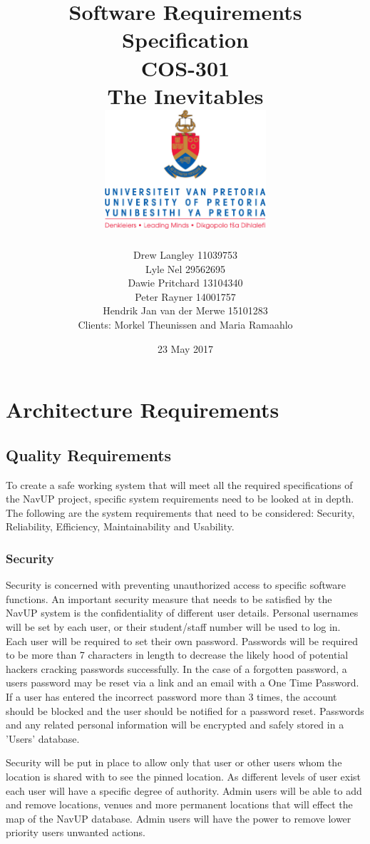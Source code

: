\documentclass{article}
\title{ Software Requirements Specification \\ COS-301 \\ The Inevitables \\[0.5cm] \includegraphics[width=6cm]{front-page}}
\author{Drew Langley \hfill 11039753 \\ Lyle Nel \hfill 29562695 \\ Dawie Pritchard \hfill 13104340 \\  Peter Rayner \hfill 14001757\\ Hendrik Jan van der Merwe \hfill 15101283 \\ [1cm] Clients: Morkel Theunissen and Maria Ramaahlo }
\date{23 May 2017}
\begin{document}
\maketitle
\pagebreak
\tableofcontents
\pagebreak


\newpage
	\section{Architecture Requirements}
		\subsection{Quality Requirements}
		 To create a safe working system that will meet all the required specifications of the NavUP project, specific system requirements need to be looked at in depth. The following are the system requirements that need to be considered: Security, Reliability, Efficiency, Maintainability and Usability.
		 
		 \subsubsection{Security}
		 Security is concerned with preventing unauthorized access to specific software functions. An important security measure that needs to be satisfied by the NavUP system is the confidentiality of different user details. Personal usernames will be set by each user, or their student/staff number will be used to log in. Each user will be required to set their own password. Passwords will be required to be more than 7 characters in length to decrease the likely hood of potential hackers cracking passwords successfully. In the case of a forgotten password, a users password may be reset via a link and an email with a One Time Password. If a user has entered the incorrect password more than 3 times, the account should be blocked and the user should be notified for a password reset. Passwords and any related personal information will be encrypted and safely stored in a 'Users' database.
		 
	Security will be put in place to allow only that user or other users whom the location is shared with to see the pinned location. As different levels of user exist each user will have a specific degree of authority. Admin users will be able to add and remove locations, venues and more permanent locations that will effect the map of the NavUP database. Admin users will have the power to remove lower priority users unwanted actions.
		 
\end{document}
